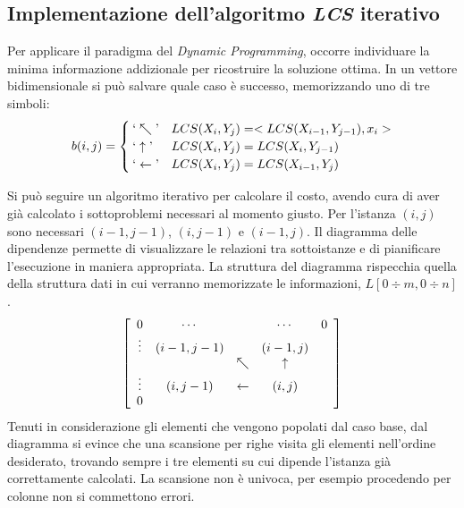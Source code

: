 \subsection{Implementazione dell'algoritmo \emph{LCS} iterativo}
Per applicare il paradigma del \emph{Dynamic Programming}, occorre individuare la minima informazione addizionale per ricostruire la soluzione ottima.
In un vettore bidimensionale si può salvare quale caso è successo, memorizzando uno di tre simboli:
\begin{equation*}
    b(i,j) = 
    \begin{cases}
        ` \nwarrow \textrm{'}
        &
        LCS(X_i, Y_j)
        = < LCS(X_{i-1}, Y_{j-1}), x_i >
        \\
        ` \uparrow \textrm{'}
        &
        LCS(X_i, Y_j)
        = LCS(X_{i}, Y_{j-1})
        \\
        ` \leftarrow \textrm{'} 
        &
        LCS(X_i, Y_j)
        = LCS(X_{i-1}, Y_{j})
    \end{cases}
\end{equation*}

Si può seguire un algoritmo iterativo per calcolare il costo, avendo cura di aver già calcolato i sottoproblemi necessari al momento giusto. Per l'istanza $(i,j)$ sono necessari $(i-1,j-1)$, $(i,j-1)$ e $(i-1,j)$. Il diagramma delle dipendenze permette di visualizzare le relazioni tra sottoistanze e di pianificare l'esecuzione in maniera appropriata. La struttura del diagramma rispecchia quella della struttura dati in cui verranno memorizzate le informazioni, $L\left[ 0 \div m, 0\div n \right]$.
\begin{equation*}
    \left[ 
    \begin{array}[H]{ccccc}
        0 & \cdots & & \cdots & 0 \\
        \vdots & (i-1,j-1) & & (i-1,j) & \\
        & & \nwarrow & \uparrow & \\
        \vdots & (i,j-1) & \leftarrow & (i,j) & \\
        0 &&&&\\
    \end{array}
    \right]
\end{equation*}
Tenuti in considerazione gli elementi che vengono popolati dal caso base, dal diagramma si evince che una scansione per righe visita gli elementi nell'ordine desiderato, trovando sempre i tre elementi su cui dipende l'istanza già correttamente calcolati. La scansione non è univoca, per esempio procedendo per colonne non si commettono errori.

